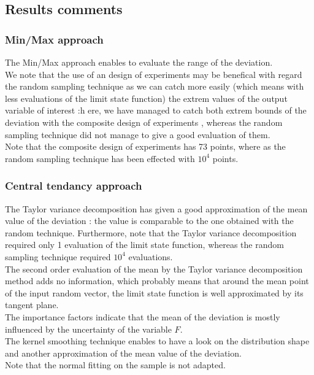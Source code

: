 \documentclass[11pt]{article}
\begin{document}
\subsection{Results comments}

\subsubsection{Min/Max approach}

The Min/Max approach enables to evaluate the range of the deviation.\\

We note that the use of an design of experiments  may be benefical with regard the random sampling technique as we can catch more easily (which means with less evaluations of the limit state function) the extrem values of the output variable of interest :h ere, we have managed to catch both extrem bounds of the deviation with the composite design of experiments , whereas the random sampling technique did not manage to give a good evaluation of them.\\

Note that the composite design of experiments  has 73 points, where as the random sampling technique has been effected with $10^4$ points.



\subsubsection{Central tendancy approach}

The Taylor variance decomposition has given a good approximation of  the mean value of the deviation : the value is comparable to the one obtained with the random technique. Furthermore, note that the Taylor variance decomposition required only 1 evaluation of the limit state function, whereas the random sampling technique required $10^4$ evaluations.\\

The second order evaluation of the mean by the  Taylor variance decomposition method adds no information, which probably means that around the mean point of the input random vector, the limit state function is well approximated by its tangent plane.\\

The importance factors indicate that the mean of the deviation is mostly influenced by the uncertainty of the variable $F$.\\

The kernel smoothing technique enables to have a look on the distribution shape and  another approximation of the mean value of the deviation.\\
Note that the normal fitting on the sample is not adapted.
\end{document}
